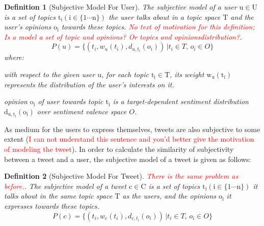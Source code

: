 \documentclass{acm_proc_article-sp}
\newtheorem{definition}{Definition}
\newcommand{\mo}[1]{\textcolor{red}{#1}}
\begin{document}
\begin{definition}[Subjective Model For User]
The subjective model of a user $\mathrm{u \in U}$ is a set of topics $\mathrm{t_{i} \left( i \in \lbrace1 \cdots n \rbrace \right) }$ 
the user talks about in a topic space $\mathrm{T}$ and the user's opinions $\mathrm{o_{i}}$ towards these topics. \mo{No text of motivation for this definition; Is a model a set of topic and opinions? Or topics and opinionsdistribution?}. 
\begin{equation}
\label{usermodel}
P \left( u \right) = \lbrace \left( t_{i}, w_{u} \left( t_{i} \right), d_{u,t_{i}} \left( o_{i} \right) \right) \,\vert  t_{i} \in T, \, o_{i} \in O \rbrace
\end{equation}
where:
\begin{itemize*}
\item with respect to the given user $\mathrm{u}$,  for each topic $\mathrm{t_{i} \in T}$, its  weight $\mathrm{ w_{u} \left( t_{i} \right)}$ represents the distribution of the user's interests on it.
\item opinion $\mathrm{o_{i}}$ of user towards topic $\mathrm{t_{i}}$ is a target-dependent sentiment distribution  $\mathrm{d_{u,t_{i}} \left( o_{i} \right)}$ over sentiment valence space $O$.
\end{itemize*}
\end{definition}

As medium for the users to express themselves, tweets are also subjective to some extent (\mo{I can not understand this sentence and you'd better give the motivation of modeling the tweet}). In order to calculate the similarity of subjectivity between a  tweet and a user, the subjective model of a tweet is given as follows:

\begin{definition}[Subjective Model For Tweet] \mo{There is the same problem as before.}. 
The subjective model of a tweet $\mathrm{c \in C}$ is a set of topics $\mathrm{t_{i} \left( i \in \lbrace1 \cdots n \rbrace \right) }$ it talks about in the same topic space $\mathrm{T}$ as the users, and the opinions $\mathrm{o_{i}}$ it expresses towards these topics.
\begin{equation}
\label{tweetmodel}
P \left( c \right) = \lbrace \left( t_{i}, w_{c} \left( t_{i} \right), d_{c,t_{i}} \left( o_{i} \right) \right) \,\vert  t_{i} \in T, \, o_{i} \in O \rbrace
\end{equation}
\end{definition}
\end{document}
